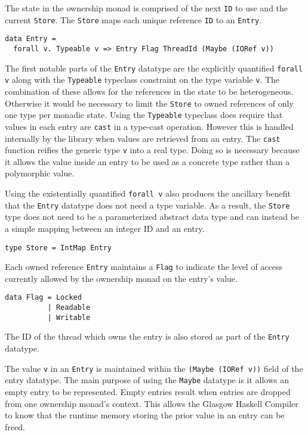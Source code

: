 \documentclass[onehalf,11pt]{beavtex}
\begin{document}
The state in the ownership monad is comprised of the next \texttt{ID}
to use and the current \texttt{Store}.  The \texttt{Store} maps each unique
reference \texttt{ID} to an \texttt{Entry}.

\begin{verbatim}
data Entry =
  forall v. Typeable v => Entry Flag ThreadId (Maybe (IORef v))
\end{verbatim}

The first notable parts of the \texttt{Entry} datatype are the explicitly
quantified \texttt{forall v} along with the \texttt{Typeable} typeclass
constraint on the type variable \texttt{v}.
The combination of these allows for the references in the state to be
heterogeneous.
Otherwise it would be necessary to limit the \texttt{Store} to owned
references of only one type per monadic state. %
Using the \texttt{Typeable} typeclass does require that values in each entry are
\texttt{cast} in a type-cast operation.  However this is handled internally
by the library when values are retrieved from an entry.
The \texttt{cast} function reifies the generic type \texttt{v} into a real
type.
Doing so is necessary because it allows the value inside an entry to be used
as a concrete type rather than a polymorphic value.

Using the existentially quantified \texttt{forall v} also produces the
ancillary benefit that the \texttt{Entry} datatype does not need a type
variable.
As a result, the \texttt{Store} type does not need to be a parameterized abstract
data type and can instead be a simple mapping between an integer ID and an entry.

\begin{verbatim}
type Store = IntMap Entry
\end{verbatim}

Each owned reference \texttt{Entry} maintains a \texttt{Flag} to indicate the
level of access currently allowed by the ownership monad on the entry's value.

\begin{verbatim}
data Flag = Locked
          | Readable
          | Writable
\end{verbatim}

The ID of the thread which owns the entry is also stored as part of the
\texttt{Entry} datatype. 

The value \texttt{v} in an \texttt{Entry} is maintained within the
\texttt{(Maybe (IORef v))} field of the entry datatype.
The main purpose of using the \texttt{Maybe} datatype is it allows an empty entry
to be represented.
Empty entries result when entries are dropped from one ownership monad's
context.  This allows the Glasgow Haskell Compiler to know that
the runtime memory storing the prior value in an entry can be freed.
\end{document}
